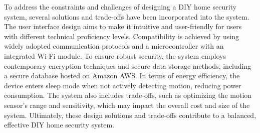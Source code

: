 \documentclass[conference]{IEEEtran}
\begin{document}
To address the constraints and challenges of designing a DIY home security system,
several solutions and trade-offs have been incorporated into the system. The user
interface design aims to make it intuitive and user-friendly for users with different
technical proficiency levels. Compatibility is achieved by using widely adopted
communication protocols and a microcontroller with an integrated Wi-Fi module.
To ensure robust security, the system employs contemporary encryption techniques
and secure data storage methods, including a secure database hosted on Amazon AWS.
In terms of energy efficiency, the device enters sleep mode when not actively
detecting motion, reducing power consumption. The system also includes trade-offs,
such as optimizing the motion sensor's range and sensitivity, which may impact the
overall cost and size of the system. Ultimately, these design solutions and
trade-offs contribute to a balanced, effective DIY home security system.



\end{document}

